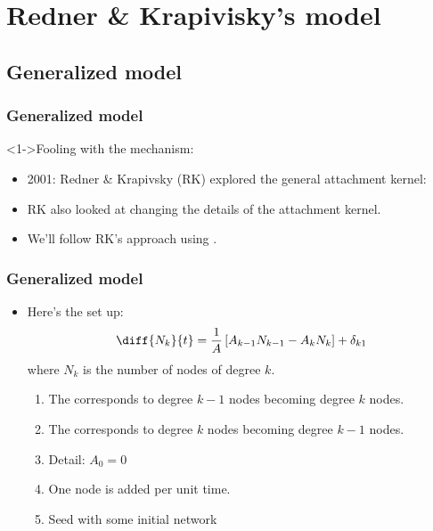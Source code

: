 \section{Redner \& Krapivisky's model}

\subsection{Generalized model}


\begin{frame}[label=]
  \frametitle{Generalized model}  

  \begin{block}<1->{Fooling with the mechanism:}
    \begin{itemize}
    \item<1->
      2001: Redner \& Krapivsky (RK)\cite{krapivsky2001a}
      explored the \alert{general attachment kernel}:
    \item<3->
      RK also looked at changing the details of
      the attachment kernel.
    \item<4->
      We'll follow RK's approach using
      .
    \end{itemize}
  \end{block}

\end{frame}

\begin{frame}
  \frametitle{Generalized model}

  \begin{itemize}
  \item<1->
      Here's the set up:
      $$
      \diff{N_k}{t}
      =
      \frac{1}{A}
      \left[
        A_{k-1} N_{k-1} - A_{k} N_{k}
      \right]
      + \delta_{k1}
      $$
      where $N_k$ is the number of nodes of degree $k$.
    \begin{enumerate}
    \item<2-> 
      The  corresponds to 
      degree $k-1$ nodes becoming degree $k$ nodes.
    \item<3-> 
      The  corresponds to 
      degree $k$ nodes becoming degree $k-1$ nodes.
    \item<4->
      Detail: $A_0=0$
    \item<5-> One node is added per unit time.
    \item<6-> Seed with some initial network\\
    \end{enumerate}
  \end{itemize}
\end{frame}

